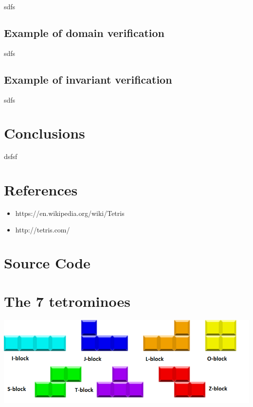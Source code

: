 \documentclass[a4paper]{article}
\begin{document}
sdfs

\subsection{Example of domain verification} 

sdfs

\subsection{Example of invariant verification} 

sdfs

\section{Conclusions} 

dsfsf

\section{References}

\begin{itemize}
\item https://en.wikipedia.org/wiki/Tetris
\item http://tetris.com/
\end{itemize}

\newpage
\appendix
\section{Source Code}

\section{The 7 tetrominoes}

\begin{center}
	\includegraphics[scale=0.7]{resources/img/tetrominoes}
	\label{tetrominoes}
\end{center}
\end{document}
